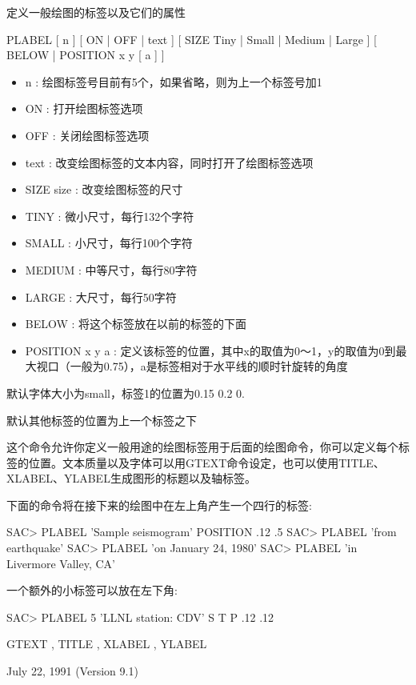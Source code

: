 \label{cmd:plabel}

定义一般绘图的标签以及它们的属性

PLABEL [ n ] [ ON | OFF | text ] [ SIZE Tiny | Small | Medium | Large ] [ BELOW | POSITION x y [ a ] ]

\begin{itemize}
\item n : 绘图标签号目前有5个，如果省略，则为上一个标签号加1
\item ON : 打开绘图标签选项 
\item OFF : 关闭绘图标签选项 
\item text : 改变绘图标签的文本内容，同时打开了绘图标签选项 
\item SIZE size :  改变绘图标签的尺寸 
\item TINY : 微小尺寸，每行132个字符 
\item SMALL :  小尺寸，每行100个字符 
\item MEDIUM : 中等尺寸，每行80字符 
\item LARGE : 大尺寸，每行50字符 
\item BELOW : 将这个标签放在以前的标签的下面 
\item POSITION x y a : 定义该标签的位置，其中x的取值为0～1，y的取值为0到最大视口（一般为0.75），a是标签相对于水平线的顺时针旋转的角度
\end{itemize}

默认字体大小为small，标签1的位置为0.15 0.2 0. 
 
默认其他标签的位置为上一个标签之下

这个命令允许你定义一般用途的绘图标签用于后面的绘图命令，你可以定义每个标签的位置。文本质量以及字体可以用GTEXT命令设定，也可以使用TITLE、XLABEL、YLABEL生成图形的标题以及轴标签。

下面的命令将在接下来的绘图中在左上角产生一个四行的标签:
\begin{SACCode}
SAC> PLABEL 'Sample seismogram' POSITION .12 .5
SAC> PLABEL 'from earthquake'
SAC> PLABEL 'on January 24, 1980'
SAC> PLABEL 'in Livermore Valley, CA'
\end{SACCode}

一个额外的小标签可以放在左下角:
\begin{SACCode}
SAC> PLABEL 5 'LLNL station: CDV' S T P .12 .12
\end{SACCode}

GTEXT , TITLE , XLABEL , YLABEL

July 22, 1991 (Version 9.1)
